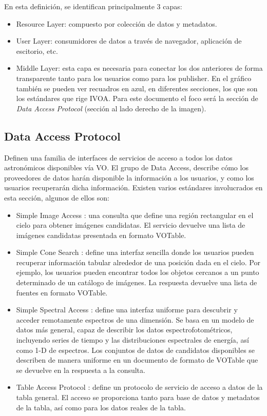 En esta definición, se identifican principalmente 3 capas:
\begin{itemize}
	\item Resource Layer: compuesto por colección de datos y metadatos.
	\item User Layer: consumidores de datos a través de navegador,
aplicación de escitorio, etc.
	\item Middle Layer: esta capa es necesaria para conectar los dos
anteriores de forma transparente tanto para los usuarios como para los
publisher. En el gráfico también se pueden ver recuadros en azul, en diferentes
secciones, los que son los estándares que rige IVOA. Para este documento el
foco será la sección de \emph{Data Access Protocol} (sección al lado derecho de
la imagen).
\end{itemize}

\subsection{Data Access Protocol}

Definen una familia de interfaces de servicios de acceso a todos los datos
astronómicos disponibles vía VO.  El grupo de Data Access, describe cómo los
proveedores de datos harán disponible la información a los usuarios, y como los
usuarios recuperarán dicha información. Existen varios estándares involucrados
en esta sección, algunos de ellos son:

\begin{itemize}
	\item Simple Image Access \cite{sia}: una consulta que define una región
rectangular en el cielo para obtener imágenes candidatas. El servicio devuelve
una lista de imágenes candidatas presentada en formato VOTable.
	\item Simple Cone Search \cite{scs}: define una interfaz sencilla donde los
usuarios pueden recuperar información tabular alrededor de una posición dada en
el cielo. Por ejemplo, los usuarios pueden encontrar todos los objetos cercanos
a un punto determinado de un catálogo de imágenes. La respuesta devuelve una
lista de fuentes en formato VOTable.
	\item Simple Spectral Access \cite{ssa}: define una interfaz uniforme para
descubrir y acceder remotamente espectros de una dimensión. Se basa en un
modelo de datos más general, capaz de describir los datos espectrofotométricos,
incluyendo series de tiempo y las distribuciones espectrales de energía, así
como 1-D de espectros. Los conjuntos de datos de candidatos disponibles se
describen de manera uniforme en un documento de formato de VOTable que se
devuelve en la respuesta a la consulta.
	\item Table Access Protocol \cite{tap}: define un protocolo de servicio de acceso
a datos de la tabla general. El acceso se proporciona tanto para base de datos
y metadatos de la tabla, así como para los datos reales de la tabla.
\end{itemize}
